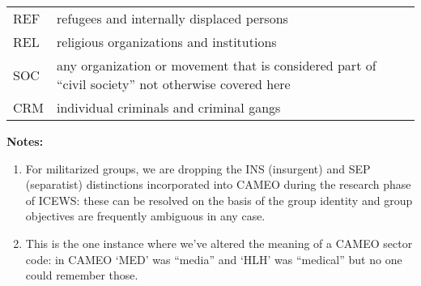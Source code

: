 \documentclass[11pt]{report}
\begin{document}
\begin{center}
\begin{longtable}{|l|p{13cm}|}
	  REF & refugees and internally displaced persons \\
	  REL & religious organizations and institutions \\ 
	  SOC & any organization or movement that is considered part of ``civil society''  not otherwise covered here\\
	  CRM & individual criminals and criminal gangs \\
  \hline
\end{longtable}
\noindent \raggedright{\textbf{Notes:}}
\begin{enumerate}
\item For militarized groups, we are dropping the INS (insurgent) and SEP (separatist) distinctions incorporated into CAMEO during the research phase of ICEWS: these can be resolved on the basis of the group identity and group objectives are frequently ambiguous in any case. 
\item This is the one instance where we've altered the meaning of a CAMEO sector code: in CAMEO `MED' was ``media'' and `HLH' was ``medical'' but no one could remember those.
\end{enumerate}
\end{center}

\end{document}
